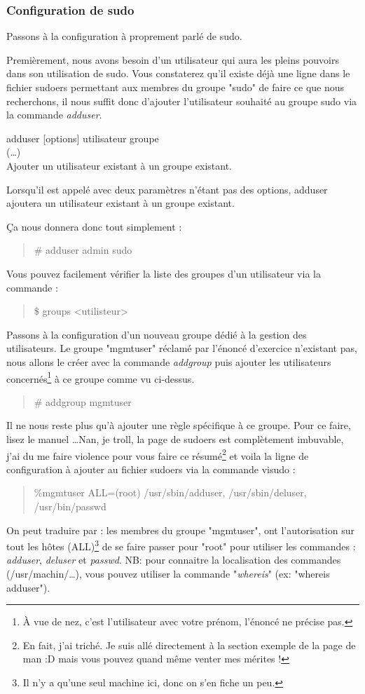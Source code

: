 \documentclass[a4paper,11pt]{article}
\newcommand{\commande}[1] {
    \begin{quote}
    \tt\raggedright #1 
    \end{quote}
}
\newcommand{\man}[2]{
    \begin{tcolorbox}[toprule=3mm,width=\textwidth,outer arc=0mm,colbacktitle=grayman,coltitle=black,colback={grayman},colframe={grayman},title={man : \tt #1}]
        \tt\raggedright #2
    \end{tcolorbox}
}
\newcommand{\mandesc}[1]{
    \begin{adjustwidth}{0.8cm}{}
        #1
    \end{adjustwidth}
}
\begin{document}
\subsubsection{Configuration de sudo}
\par Passons à la configuration à proprement parlé de sudo.
\par Premièrement, nous avons besoin d'un utilisateur qui aura les pleins pouvoirs dans son utilisation de sudo. Vous constaterez qu'il existe déjà une ligne dans le fichier sudoers permettant aux membres du groupe "sudo" de faire ce que nous recherchons, il nous suffit donc d'ajouter l'utilisateur souhaité au groupe sudo via la commande \emph{adduser}.
\man{adduser}{adduser [options] utilisateur groupe\\
(\dots)\\
Ajouter un utilisateur existant à un groupe existant.
\mandesc{Lorsqu'il est appelé avec deux paramètres n'étant pas des options, adduser ajoutera un utilisateur existant à un groupe existant.}}
\par Ça nous donnera donc tout simplement :
\commande{\# adduser admin sudo}
\par Vous pouvez facilement vérifier la liste des groupes d'un utilisateur via la commande :
\commande{\$ groups <utilisteur>}
\par Passons à la configuration d'un nouveau groupe dédié à la gestion des utilisateurs. Le groupe "mgmtuser" réclamé par l'énoncé d'exercice n'existant pas, nous allons le créer avec la commande \emph{addgroup} puis ajouter les utilisateurs concernés\footnote{À vue de nez, c'est l'utilisateur avec votre prénom, l'énoncé ne précise pas.} à ce groupe comme vu ci-dessus.
\commande{\# addgroup mgmtuser}
\par Il ne nous reste plus qu'à ajouter une règle spécifique à ce groupe. Pour ce faire, lisez le manuel \dots Nan, je troll, la page de sudoers est complètement imbuvable, j'ai du me faire violence pour vous faire ce résumé\footnote{En fait, j'ai triché. Je suis allé directement à la section exemple de la page de man :D mais vous pouvez quand même venter mes mérites !} et voila la ligne de configuration à ajouter au fichier sudoers via la commande visudo :
\commande{\%mgmtuser ALL=(root) /usr/sbin/adduser, /usr/sbin/deluser, /usr/bin/passwd}
\par On peut traduire par : les membres du groupe "mgmtuser", ont l'autorisation sur tout les hôtes (ALL)\footnote{Il n'y a qu'une seul machine ici, donc on s'en fiche un peu.} de se faire passer pour "root" pour utiliser les commandes : \emph{adduser}, \emph{deluser} et \emph{passwd}. NB: pour connaitre la localisation des commandes (/usr/machin/\dots), vous pouvez utiliser la commande "\emph{whereis}" (ex: "whereis adduser").
\end{document}
